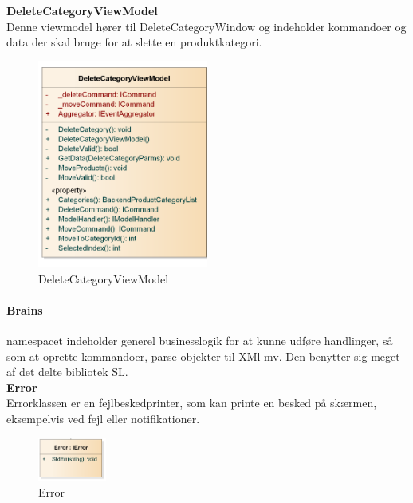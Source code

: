 \textbf{DeleteCategoryViewModel}\\
Denne viewmodel hører til DeleteCategoryWindow og indeholder kommandoer og data der skal bruge for at slette en produktkategori.
\begin{figure}[H]
	\centering
	\includegraphics[width=0.5\textwidth]{Systemdesign/backend/klassebeskrivelser/Images/DeleteCategoryVM}
	\caption{DeleteCategoryViewModel}
	\label{fig:DeleteCategoryViewModel}
\end{figure}
\bigskip

\paragraph{Brains} namespacet indeholder generel businesslogik for at kunne udføre handlinger, så som at oprette kommandoer, parse objekter til XMl mv. Den benytter sig meget af det delte bibliotek \gls{SL}.\\

\textbf{Error}\\
Errorklassen er en fejlbeskedprinter, som kan printe en besked på skærmen, eksempelvis ved fejl eller notifikationer.
\begin{figure}[!h]
    \centering
    \includegraphics[width=0.2\textwidth]{Systemdesign/backend/klassebeskrivelser/Images/Error.png}
    \caption{Error}
    \label{fig:error}
\end{figure}
 \bigskip 
 
 
 
 
 
 
 


